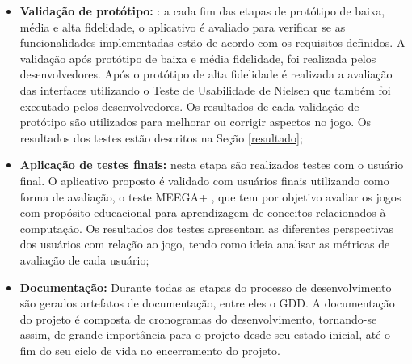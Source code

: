 \documentclass[10pt, conference, compsocconf]{IEEEtran}
\begin{document}
\begin{itemize}
	\item \textbf{Validação de protótipo:} : a cada fim das etapas de protótipo de baixa, média e alta fidelidade, o aplicativo é avaliado para verificar se as funcionalidades implementadas estão de acordo com os requisitos definidos. A validação após protótipo de baixa e média fidelidade, foi realizada pelos desenvolvedores. Após o protótipo de alta fidelidade é realizada a avaliação das interfaces utilizando o Teste de Usabilidade de Nielsen \cite{nielsen1994usability} que também foi executado pelos desenvolvedores. Os resultados de cada validação de protótipo são utilizados para melhorar ou corrigir aspectos no jogo. Os resultados dos testes estão descritos na Seção \ref{resultado};
	

	
	\item \textbf{Aplicação de testes finais:} nesta etapa são realizados testes com o usuário final. O aplicativo proposto é validado com usuários finais utilizando como forma de avaliação, o teste MEEGA+ \cite{von2018meega+}, que tem por objetivo avaliar os jogos com propósito educacional para aprendizagem de conceitos relacionados à computação. Os resultados dos testes apresentam as diferentes perspectivas dos usuários com relação ao jogo, tendo como ideia analisar as métricas de avaliação de cada usuário;
	
	\item \textbf{Documentação:} Durante todas as etapas do processo de desenvolvimento são gerados artefatos de documentação, entre eles o GDD. A documentação do projeto é composta de cronogramas do desenvolvimento, tornando-se assim, de grande importância para o projeto desde seu estado inicial, até o fim do seu ciclo de vida no encerramento do projeto. 
	


\end{itemize}
\end{document}
